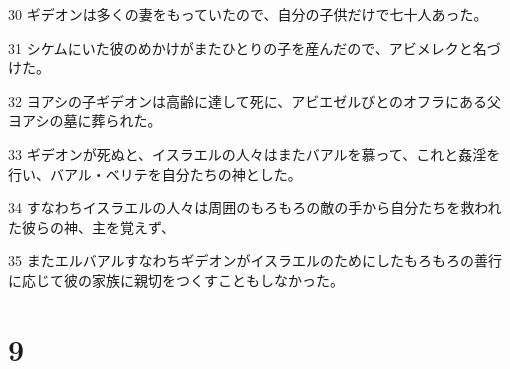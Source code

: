 \par 30 ギデオンは多くの妻をもっていたので、自分の子供だけで七十人あった。
\par 31 シケムにいた彼のめかけがまたひとりの子を産んだので、アビメレクと名づけた。
\par 32 ヨアシの子ギデオンは高齢に達して死に、アビエゼルびとのオフラにある父ヨアシの墓に葬られた。
\par 33 ギデオンが死ぬと、イスラエルの人々はまたバアルを慕って、これと姦淫を行い、バアル・ベリテを自分たちの神とした。
\par 34 すなわちイスラエルの人々は周囲のもろもろの敵の手から自分たちを救われた彼らの神、主を覚えず、
\par 35 またエルバアルすなわちギデオンがイスラエルのためにしたもろもろの善行に応じて彼の家族に親切をつくすこともしなかった。

\chapter{9}

